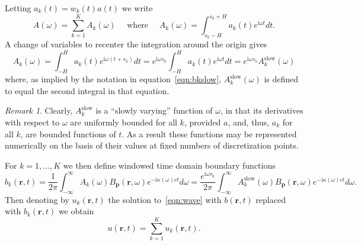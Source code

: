 \documentclass[11pt]{article}
\theoremstyle{plain}
\theoremstyle{remark}
\newtheorem{remark}{Remark}
\def \br{\mathbf{r}}
\def \bp{\mathbf{p}}
\begin{document}
Letting $a_k(t) = w_k(t)a(t)$ we write
\begin{equation}\label{eqn:BandBk}
    A(\omega) = \sum_{k=1}^K A_k(\omega) \quad \text{ where } \quad A_k(\omega) = \int_{s_k - H}^{s_k + H}a_k(t)e^{\mathrm{i}\omega t} dt.
\end{equation}
A change of variables to recenter the integration around the origin gives 
\begin{equation}\label{eqn:bkslow}
    A_k(\omega) = \int_{-H}^Ha_k(t)e^{\mathrm{i}\omega (t + s_k)}dt = e^{\mathrm{i}\omega s_k} \int_{-H}^Ha_k(t)e^{\mathrm{i}\omega t}dt = e^{\mathrm{i}\omega s_k} A_k^{\mathrm{slow}}(\omega)
\end{equation}
where, as implied by the notation in equation~\eqref{eqn:bkslow},
$A_k^{\mathrm{slow}}(\omega)$ is defined to equal the second integral
in that equation.
\begin{remark}\label{rmk:Bkslow}
  Clearly, $A_k^{\mathrm{slow}}$ is a ``slowly varying'' function of
  $\omega$, in that its derivatives with respect to $\omega$ are
  uniformly bounded for all $k$, provided $a$, and, thus, $a_k$ for
  all $k$, are bounded functions of $t$. As a result these functions
  may be represented numerically on the basis of their values at fixed
  numbers of discretization points.
\end{remark}


For $k = 1,\dots, K$ we then define windowed time domain boundary
functions
\begin{equation}
    b_k(\br,t) = \frac{1}{2\pi}\int_{-\infty}^\infty A_k(\omega)B_\bp(\br,\omega) e^{-\mathrm{i}\kappa(\omega)ct}d\omega = \frac{e^{\mathrm{i}\omega s_k}}{2\pi} \int_{-\infty}^\infty A_k^{\mathrm{slow}}(\omega) B_\bp(\br,\omega) e^{-\mathrm{i}\kappa(\omega)ct}d\omega.
\end{equation}
Then denoting by $u_k(\br,t)$ the solution to~\eqref{eqn:wave} with $b(\br,t)$ replaced with $b_k(\br,t)$ we obtain
\begin{equation}\label{eqn:u_sum_uk}
  u(\br,t) = \sum_{k=1}^K u_k(\br,t).
\end{equation}
\end{document}
